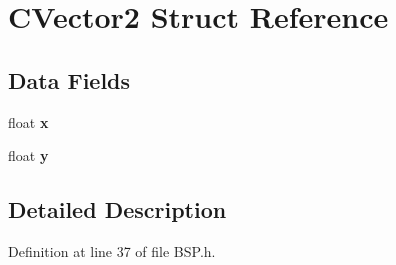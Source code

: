 \hypertarget{struct_c_vector2}{}\section{C\+Vector2 Struct Reference}
\label{struct_c_vector2}
\subsection*{Data Fields}
\begin{DoxyCompactItemize}
\item 
float {\bfseries x}\hypertarget{struct_c_vector2_a33cc20e661507c82c45d27e75563d672}{}\label{struct_c_vector2_a33cc20e661507c82c45d27e75563d672}

\item 
float {\bfseries y}\hypertarget{struct_c_vector2_a3856009668b0d289c514161ca5828e2a}{}\label{struct_c_vector2_a3856009668b0d289c514161ca5828e2a}

\end{DoxyCompactItemize}


\subsection{Detailed Description}


Definition at line 37 of file B\+S\+P.\+h.

